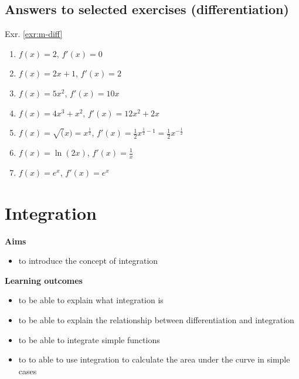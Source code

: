 \documentclass[
]{book}
\providecommand{\tightlist}{%
  \setlength{\itemsep}{0pt}\setlength{\parskip}{0pt}}
\theoremstyle{definition}
\theoremstyle{definition}
\theoremstyle{definition}
\theoremstyle{remark}
\begin{document}
\hypertarget{answers-to-selected-exercises-differentiation}{%
\section*{Answers to selected exercises (differentiation)}\label{answers-to-selected-exercises-differentiation}}

Exr. \ref{exr:m-diff}

\begin{enumerate}
\def\labelenumi{\alph{enumi})}
\tightlist
\item
  \(f(x) = 2\), \(f'(x) = 0\)
\item
  \(f(x) = 2x + 1\), \(f'(x) = 2\)
\item
  \(f(x) = 5x^2\), \(f'(x)= 10x\)
\item
  \(f(x) = 4x^3 + x^2\), \(f'(x)=12x^2 + 2x\)
\item
  \(f(x) = \sqrt(x) = x^{\frac{1}{2}}\), \(f'(x)=\frac{1}{2}x^{\frac{1}{2}-1} = \frac{1}{2}x^{-\frac{1}{2}}\)
\item
  \(f(x) = \ln(2x)\), \(f'(x) = \frac{1}{x}\)
\item
  \(f(x) = e^{x}\), \(f'(x) = e^x\)
\end{enumerate}

\hypertarget{integration}{%
\chapter{Integration}\label{integration}}

\textbf{Aims}

\begin{itemize}
\tightlist
\item
  to introduce the concept of integration
\end{itemize}

\textbf{Learning outcomes}

\begin{itemize}
\tightlist
\item
  to be able to explain what integration is
\item
  to be able to explain the relationship between differentiation and integration
\item
  to be able to integrate simple functions
\item
  to to able to use integration to calculate the area under the curve in simple cases
\end{itemize}
\end{document}
